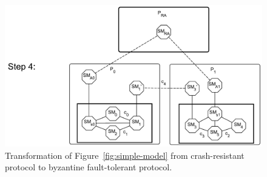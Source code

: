 \documentclass{article}
\begin{document}
	\begin{figure}[ht!]
		\center
		\includegraphics[scale=0.39]{figures/state-machines/distributed-protocol-model-transformation4.pdf}
		\caption{Transformation of Figure~\ref{fig:simple-model} from crash-resistant protocol to byzantine fault-tolerant protocol.\label{fig:tranformation-model}}
	\end{figure}
	\FloatBarrier
\end{document}
